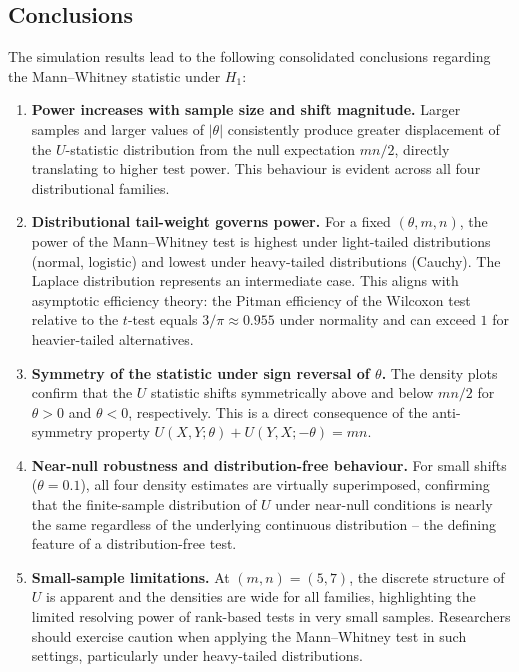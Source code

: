 \documentclass[10pt]{article}
\begin{document}
\subsection*{Conclusions}

The simulation results lead to the following consolidated conclusions regarding the
Mann--Whitney statistic under $H_1$:

\begin{enumerate}

  \item \textbf{Power increases with sample size and shift magnitude.}  Larger
        samples and larger values of $|\theta|$ consistently produce greater
        displacement of the $U$-statistic distribution from the null expectation
        $mn/2$, directly translating to higher test power.  This behaviour is
        evident across all four distributional families.

  \item \textbf{Distributional tail-weight governs power.}  For a fixed
        $(\theta, m, n)$, the power of the Mann--Whitney test is highest under
        light-tailed distributions (normal, logistic) and lowest under heavy-tailed
        distributions (Cauchy).  The Laplace distribution represents an intermediate
        case.  This aligns with asymptotic efficiency theory: the Pitman efficiency
        of the Wilcoxon test relative to the $t$-test equals $3/\pi \approx 0.955$
        under normality and can exceed $1$ for heavier-tailed alternatives.

  \item \textbf{Symmetry of the statistic under sign reversal of $\theta$.}
        The density plots confirm that the $U$ statistic shifts symmetrically above
        and below $mn/2$ for $\theta>0$ and $\theta<0$, respectively.  This is a
        direct consequence of the anti-symmetry property
        $U(X,Y;\theta) + U(Y,X;-\theta) = mn$.

  \item \textbf{Near-null robustness and distribution-free behaviour.}  For small
        shifts ($\theta=0.1$), all four density estimates are virtually
        superimposed, confirming that the finite-sample distribution of $U$ under
        near-null conditions is nearly the same regardless of the underlying
        continuous distribution -- the defining feature of a distribution-free test.

  \item \textbf{Small-sample limitations.}  At $(m,n)=(5,7)$, the discrete
        structure of $U$ is apparent and the densities are wide for all families,
        highlighting the limited resolving power of rank-based tests in very small
        samples.  Researchers should exercise caution when applying the
        Mann--Whitney test in such settings, particularly under heavy-tailed
        distributions.

\end{enumerate}
\end{document}
